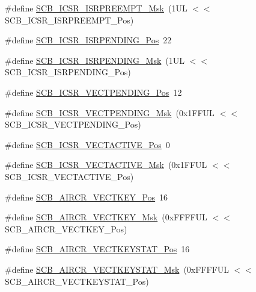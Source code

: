 \begin{DoxyCompactItemize}
\item 
\#define \hyperlink{group___c_m_s_i_s___s_c_b_gaa966600396290808d596fe96e92ca2b5}{S\+C\+B\+\_\+\+I\+C\+S\+R\+\_\+\+I\+S\+R\+P\+R\+E\+E\+M\+P\+T\+\_\+\+Msk}~(1\+U\+L $<$$<$ S\+C\+B\+\_\+\+I\+C\+S\+R\+\_\+\+I\+S\+R\+P\+R\+E\+E\+M\+P\+T\+\_\+\+Pos)
\item 
\#define \hyperlink{group___c_m_s_i_s___s_c_b_ga10749d92b9b744094b845c2eb46d4319}{S\+C\+B\+\_\+\+I\+C\+S\+R\+\_\+\+I\+S\+R\+P\+E\+N\+D\+I\+N\+G\+\_\+\+Pos}~22
\item 
\#define \hyperlink{group___c_m_s_i_s___s_c_b_ga056d74fd538e5d36d3be1f28d399c877}{S\+C\+B\+\_\+\+I\+C\+S\+R\+\_\+\+I\+S\+R\+P\+E\+N\+D\+I\+N\+G\+\_\+\+Msk}~(1\+U\+L $<$$<$ S\+C\+B\+\_\+\+I\+C\+S\+R\+\_\+\+I\+S\+R\+P\+E\+N\+D\+I\+N\+G\+\_\+\+Pos)
\item 
\#define \hyperlink{group___c_m_s_i_s___s_c_b_gada60c92bf88d6fd21a8f49efa4a127b8}{S\+C\+B\+\_\+\+I\+C\+S\+R\+\_\+\+V\+E\+C\+T\+P\+E\+N\+D\+I\+N\+G\+\_\+\+Pos}~12
\item 
\#define \hyperlink{group___c_m_s_i_s___s_c_b_gacb6992e7c7ddc27a370f62878a21ef72}{S\+C\+B\+\_\+\+I\+C\+S\+R\+\_\+\+V\+E\+C\+T\+P\+E\+N\+D\+I\+N\+G\+\_\+\+Msk}~(0x1\+F\+F\+U\+L $<$$<$ S\+C\+B\+\_\+\+I\+C\+S\+R\+\_\+\+V\+E\+C\+T\+P\+E\+N\+D\+I\+N\+G\+\_\+\+Pos)
\item 
\#define \hyperlink{group___c_m_s_i_s___s_c_b_gae4f602c7c5c895d5fb687b71b0979fc3}{S\+C\+B\+\_\+\+I\+C\+S\+R\+\_\+\+V\+E\+C\+T\+A\+C\+T\+I\+V\+E\+\_\+\+Pos}~0
\item 
\#define \hyperlink{group___c_m_s_i_s___s_c_b_ga5533791a4ecf1b9301c883047b3e8396}{S\+C\+B\+\_\+\+I\+C\+S\+R\+\_\+\+V\+E\+C\+T\+A\+C\+T\+I\+V\+E\+\_\+\+Msk}~(0x1\+F\+F\+U\+L $<$$<$ S\+C\+B\+\_\+\+I\+C\+S\+R\+\_\+\+V\+E\+C\+T\+A\+C\+T\+I\+V\+E\+\_\+\+Pos)
\item 
\#define \hyperlink{group___c_m_s_i_s___s_c_b_gaaa27c0ba600bf82c3da08c748845b640}{S\+C\+B\+\_\+\+A\+I\+R\+C\+R\+\_\+\+V\+E\+C\+T\+K\+E\+Y\+\_\+\+Pos}~16
\item 
\#define \hyperlink{group___c_m_s_i_s___s_c_b_ga90c7cf0c490e7ae55f9503a7fda1dd22}{S\+C\+B\+\_\+\+A\+I\+R\+C\+R\+\_\+\+V\+E\+C\+T\+K\+E\+Y\+\_\+\+Msk}~(0x\+F\+F\+F\+F\+U\+L $<$$<$ S\+C\+B\+\_\+\+A\+I\+R\+C\+R\+\_\+\+V\+E\+C\+T\+K\+E\+Y\+\_\+\+Pos)
\item 
\#define \hyperlink{group___c_m_s_i_s___s_c_b_gaec404750ff5ca07f499a3c06b62051ef}{S\+C\+B\+\_\+\+A\+I\+R\+C\+R\+\_\+\+V\+E\+C\+T\+K\+E\+Y\+S\+T\+A\+T\+\_\+\+Pos}~16
\item 
\#define \hyperlink{group___c_m_s_i_s___s_c_b_gabacedaefeefc73d666bbe59ece904493}{S\+C\+B\+\_\+\+A\+I\+R\+C\+R\+\_\+\+V\+E\+C\+T\+K\+E\+Y\+S\+T\+A\+T\+\_\+\+Msk}~(0x\+F\+F\+F\+F\+U\+L $<$$<$ S\+C\+B\+\_\+\+A\+I\+R\+C\+R\+\_\+\+V\+E\+C\+T\+K\+E\+Y\+S\+T\+A\+T\+\_\+\+Pos)

\end{DoxyCompactItemize}
